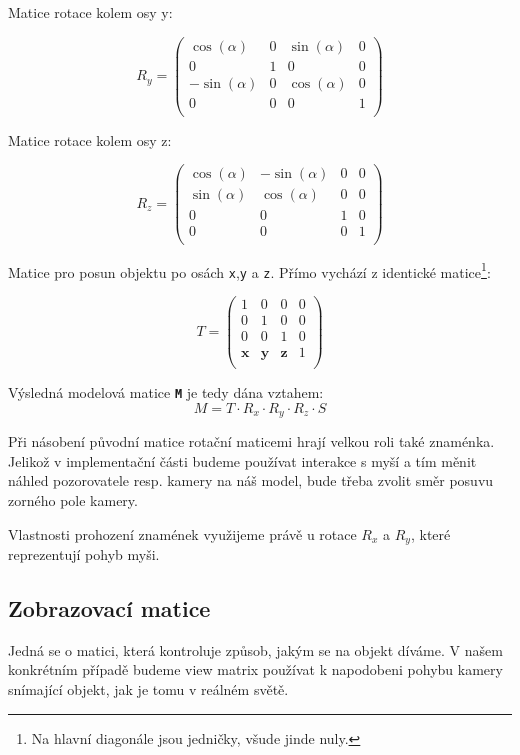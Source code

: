 Matice rotace kolem osy y:

$$
R_{y}=
\begin{pmatrix} 
 \cos(\alpha) & 0 & \sin(\alpha) & 0\\
0 & 1 & 0 & 0\\ 
-\sin(\alpha) & 0 & \cos(\alpha) & 0\\ 
0 & 0 & 0 & 1\\ 
\end{pmatrix}$$

Matice rotace kolem osy z:

$$
R_{z}=
\begin{pmatrix} 
\cos(\alpha) & -\sin(\alpha) & 0 & 0\\
\sin(\alpha) & \cos(\alpha) & 0 & 0\\ 
0 & 0 & 1 & 0\\ 
0 & 0 & 0 & 1\\ 
\end{pmatrix}$$

\newpage


Matice pro posun objektu po osách \texttt{x},\texttt{y} a \texttt{z}. Přímo vychází z identické matice\footnote{Na hlavní diagonále jsou jedničky, všude jinde nuly.}:


$$
T =
\begin{pmatrix} 
1 & 0 & 0 & 0\\
0 & 1 & 0 & 0\\ 
0 & 0 & 1 & 0\\ 
\textbf{x} & \textbf{y} & \textbf{z} & 1\\ 
\end{pmatrix}$$



Výsledná modelová matice \texttt{\textbf{M}} je tedy dána vztahem:
$$ M = T \cdot R_{x} \cdot R_{y} \cdot R_{z} \cdot S $$

Při násobení původní matice rotační maticemi hrají  velkou roli také znaménka. Jelikož v implementační části budeme používat interakce s myší a tím měnit náhled pozorovatele resp. kamery na náš model, bude třeba zvolit směr posuvu zorného pole kamery. 

Vlastnosti prohození znamének využijeme právě u  rotace $R_{x}$ a $R_{y}$, které reprezentují pohyb myši.  


\subsection{Zobrazovací matice}
Jedná se o matici, která kontroluje způsob, jakým se na objekt díváme. V našem konkrétním případě budeme view matrix používat k napodobeni pohybu kamery snímající objekt, jak je tomu v reálném světě. 

